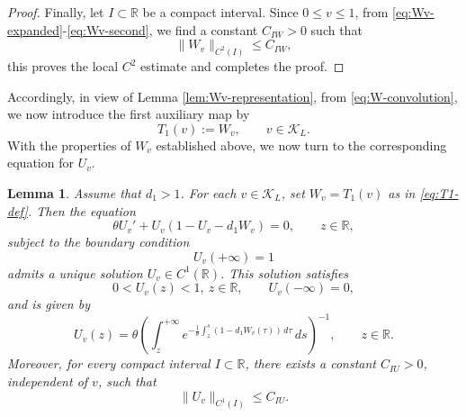 \documentclass[preprint,sort&compress,final,12pt]{elsarticle}
\newtheorem{lemma}[theorem]{Lemma}
\numberwithin{equation}{section}
\begin{document}
\begin{proof}
Finally, let $I\subset\mathbb R$ be a compact interval. Since $0\le v\le1$, from \eqref{eq:Wv-expanded}-\eqref{eq:Wv-second}, we find a constant $C_{IW}>0$ such that
\begin{equation*}
\|W_v\|_{C^2(I)}\le C_{IW},
\end{equation*}
this proves the local $C^2$ estimate and completes the proof.

\end{proof}
 
Accordingly, in view of Lemma \ref{lem:Wv-representation}, from \eqref{eq:W-convolution}, we now introduce the first auxiliary map by
\begin{equation}\label{eq:T1-def}
T_1(v):=W_v,\qquad v\in\mathcal K_L.
\end{equation}
With the properties of $W_v$ established above, we now turn to the corresponding equation for $U_v$.
  
\begin{lemma}\label{lem:U-basic}
Assume that $d_1>1$. For each $v\in\mathcal K_L$, set
$W_v=T_1(v)$ as in \eqref{eq:T1-def}. Then the equation
\begin{equation}\label{eq:Uv-problem}
\theta U_v'+U_v(1-U_v-d_1W_v)=0,\qquad z\in\mathbb R,
\end{equation}
subject to the boundary condition
\begin{equation}\label{eq:Uv-plus-bc}
U_v(+\infty)=1
\end{equation}
admits a unique solution $U_v\in C^1(\mathbb R)$. This solution satisfies
\begin{equation*}
0<U_v(z)<1,\ z\in\mathbb R,\qquad U_v(-\infty)=0,
\end{equation*}
and is given by
\begin{equation}\label{eq:Uv-formula}
U_v(z)=\theta\left(\int_z^{+\infty}e^{-\frac{1}{\theta}\int_z^s(1-d_1W_v(\tau))\,d\tau}\,ds\right)^{-1},\qquad z\in\mathbb R.
\end{equation}
Moreover, for every compact interval $I\subset\mathbb R$, there exists a constant $C_{IU}>0$, independent of $v$, such that
\begin{equation}\label{eq:U-C1}
\|U_v\|_{C^1(I)}\le C_{IU}.
\end{equation}
\end{lemma}
\end{document}
